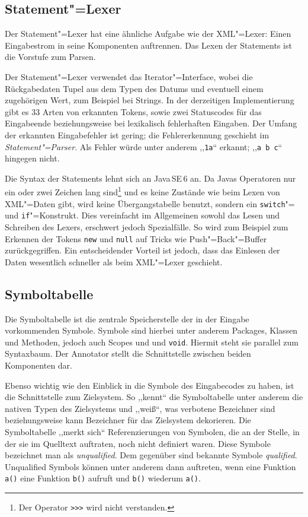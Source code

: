 \documentclass[10pt,a4paper,ngerman,titlepage,tocindentauto]{scrartcl}
\begin{document}
		\subsection{Statement"=Lexer}
			Der Statement"=Lexer hat eine ähnliche Aufgabe wie der XML"=Lexer: Einen Eingabestrom in seine
			Komponenten auftrennen. Das Lexen der Statements ist die Vorstufe zum Parsen.
			
			Der Statement"=Lexer verwendet das Iterator"=Interface, wobei die Rückgabedaten
			Tupel aus dem Typen des Datums und eventuell einem zugehörigen Wert, zum Beispiel bei Strings.
			In der derzeitigen Implementierung gibt es 33 Arten von erkannten Tokens, sowie zwei
			Statuscodes für das Eingabeende beziehungsweise bei lexikalisch fehlerhaften Eingaben.
			Der Umfang der erkannten Eingabefehler ist gering; die Fehlererkennung geschieht im
			{\em Statement"=Parser}. Als Fehler würde unter anderem ,,\verb|1a|`` erkannt; ,,\verb|a b c|`` hingegen nicht.
			
			Die Syntax der Statements lehnt sich an Java\,SE\,6 an. Da Javas Operatoren nur ein oder
			zwei Zeichen lang sind\footnote{Der Operator \texttt{{>}>{>}} wird nicht verstanden.} und es keine Zustände wie beim
			Lexen von XML"=Daten gibt, wird keine Übergangstabelle benutzt, sondern ein \verb|switch|"= und
			\verb|if|"=Konstrukt. Dies vereinfacht im Allgemeinen sowohl das Lesen und Schreiben des Lexers,
			erschwert jedoch Spezialfälle. So wird zum Beispiel zum Erkennen der Tokens \verb|new| und
			\verb|null| auf Tricks wie Push"=Back"=Buffer zurückgegriffen.
			Ein entscheidender Vorteil ist jedoch, dass das Einlesen der Daten wesentlich schneller
			als beim XML"=Lexer geschieht.
	
		\subsection{Symboltabelle}
			Die Symboltabelle ist die zentrale Speicherstelle der in der Eingabe vorkommenden Symbole.
			Symbole sind hierbei unter anderem Packages, Klassen und Methoden, jedoch auch Scopes und und \texttt{void}.
			Hiermit steht sie parallel zum Syntaxbaum. Der Annotator stellt die Schnittstelle zwischen beiden
			Komponenten dar.
			
			Ebenso wichtig wie den Einblick in die Symbole des Eingabecodes zu haben, ist die Schnittstelle
			zum Zielsystem. So ,,kennt`` die Symboltabelle unter anderem die nativen Typen des Zielsystems und
			,,weiß``, was verbotene Bezeichner sind beziehungsweise kann Bezeichner für das Zielsystem
			dekorieren. Die Symboltabelle ,,merkt sich`` Referenzierungen von Symbolen, die an der Stelle, in
			der sie im Quelltext auftraten, noch nicht definiert waren. Diese Symbole bezeichnet man als
			{\em unqualified}. Dem gegenüber sind bekannte Symbole {\em qualified}. Unqualified Symbols können
			unter anderem dann auftreten, wenn eine Funktion \texttt{a()} eine Funktion \texttt{b()} aufruft
			und \texttt{b()} wiederum \texttt{a()}.
			
\end{document}
